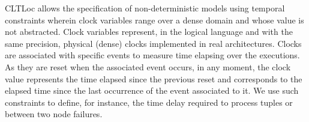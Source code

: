 CLTLoc allows the specification of non-deterministic models using temporal constraints wherein clock variables range over a dense domain and whose value is not abstracted.
Clock variables represent, in the logical language and with the same precision, physical (dense) clocks implemented in real architectures.
Clocks are associated with specific events to measure time elapsing over the executions.
As they are reset when the associated event occurs, in any moment, the clock value represents the time elapsed since the previous reset and corresponds to the elapsed time since the last occurrence of the event associated to it.
We use such constraints to define, for instance, the time delay required to process tuples or between two node failures.\\





